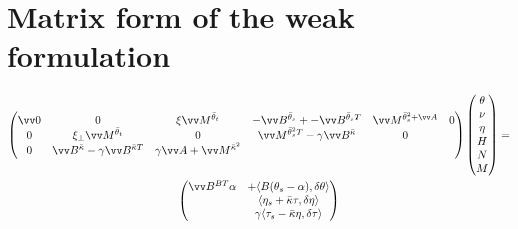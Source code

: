 

\section{Matrix form of the weak
formulation}\label{matrix-form-of-the-weak-formulation}

\begin{multline}
\label{eq:6}
\begin{pmatrix}
\vv 0 & 0 & \xi\par\vv M^{\bar{\theta}_t} & -\vv B^{\bar{\theta}_s} + -\vv B^{\bar{\theta}_s T} & \vv M^{\bar{\theta}^2_s +\vv A} & 0 \\
0 & \xi_\perp\vv M^{\bar{\theta}_t} & 0 &
 \vv M^{\bar\theta^2_s T}
- \gamma\vv B^{\bar\kappa}  & 0\\
0 & 
 \vv B^{\bar\kappa}
- \gamma\vv B^{\bar\kappa T} 
&
%
%
\gamma \vv A
+ \vv M^{\bar \kappa^2}
\end{pmatrix}
%
\begin{pmatrix}
\theta\phantom{\big|\!\!}\\
\nu\phantom{\big|\!\!} \\
\eta\phantom{\big|\!\!}\\
H\phantom{\big|\!\!}\\
N\phantom{\big|\!\!}\\
M\phantom{\big|\!\!}
\end{pmatrix}
=\\
\begin{pmatrix}
\vv B^{BT}\alpha & +\langle B(\theta_s-\alpha), \delta \theta\rangle\\
& \langle \eta_s+\bar\kappa\tau,\delta\eta\rangle
\\
&\gamma\langle\tau_{s}-\bar \kappa\eta, \delta\tau\rangle 
\end{pmatrix}
\end{multline}


  
  